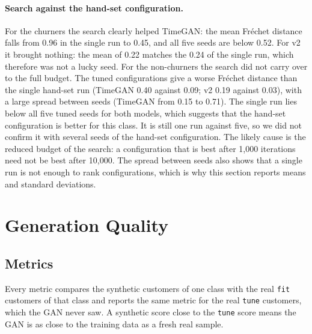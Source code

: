\documentclass{article}
\begin{document}
\paragraph{Search against the hand-set configuration.} For the churners the search clearly helped TimeGAN: the mean Fréchet distance falls from 0.96 in the single run to 0.45, and all five seeds are below 0.52. For v2 it brought nothing: the mean of 0.22 matches the 0.24 of the single run, which therefore was not a lucky seed. For the non-churners the search did not carry over to the full budget. The tuned configurations give a worse Fréchet distance than the single hand-set run (TimeGAN 0.40 against 0.09; v2 0.19 against 0.03), with a large spread between seeds (TimeGAN from 0.15 to 0.71). The single run lies below all five tuned seeds for both models, which suggests that the hand-set configuration is better for this class. It is still one run against five, so we did not confirm it with several seeds of the hand-set configuration. The likely cause is the reduced budget of the search: a configuration that is best after 1{,}000 iterations need not be best after 10{,}000. The spread between seeds also shows that a single run is not enough to rank configurations, which is why this section reports means and standard deviations.

\section{Generation Quality}
\label{sec:w5_quality}

\subsection{Metrics}

Every metric compares the synthetic customers of one class with the real \texttt{fit} customers of that class and reports the same metric for the real \texttt{tune} customers, which the GAN never saw. A synthetic score close to the \texttt{tune} score means the GAN is as close to the training data as a fresh real sample.
\end{document}
